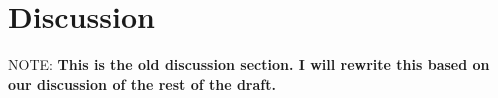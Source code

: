 \documentclass[11pt]{article}
\begin{document}
%

\section{Discussion} 
NOTE: \textbf{This is the old discussion section.  I will rewrite this based on our discussion of the rest of the draft.}
\end{document}
